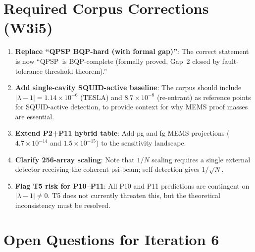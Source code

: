 \documentclass[11pt]{article}
\theoremstyle{definition}
\theoremstyle{remark}
\newcommand{\QPSP}{\textsc{QPSP}}
\newcommand{\lam}{\lambda}
\newcommand{\ee}[1]{\times 10^{#1}}
\begin{document}
\section{Required Corpus Corrections (W3i5)}
\label{sec:corpus_corrections}

\begin{enumerate}
\item \textbf{Replace ``QPSP BQP-hard (with formal gap)''}: The correct
  statement is now ``\QPSP\ is BQP-complete (formally proved, Gap~2
  closed by fault-tolerance threshold theorem).''

\item \textbf{Add single-cavity SQUID-active baseline}: The corpus should
  include $|\lam-1| = 1.14\ee{-6}$ (TESLA) and $8.7\ee{-8}$ (re-entrant)
  as reference points for SQUID-active detection, to provide context
  for why MEMS proof masses are essential.

\item \textbf{Extend P2+P11 hybrid table}: Add pg and fg MEMS projections
  ($4.7\ee{-14}$ and $1.5\ee{-15}$) to the sensitivity landscape.

\item \textbf{Clarify 256-array scaling}: Note that $1/N$ scaling requires
  a single external detector receiving the coherent psi-beam; self-detection
  gives $1/\sqrt{N}$.

\item \textbf{Flag T5 risk for P10--P11}: All P10 and P11 predictions
  are contingent on $|\lam-1| \neq 0$. T5 does not currently threaten
  this, but the theoretical inconsistency must be resolved.
\end{enumerate}

\section{Open Questions for Iteration 6}
\label{sec:open_questions}
\end{document}
